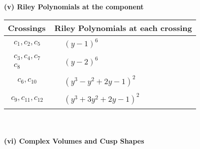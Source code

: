 \documentclass[1p]{elsarticle_modified}
\theoremstyle{definition}
\begin{document}
\newpage\renewcommand{\arraystretch}{1}
\flushleft \textbf{(v) Riley Polynomials at the component}\newline \\
\begin{tabular}{m{50pt}|m{274pt}}
Crossings & \hspace{64pt}Riley Polynomials at each crossing \\
\hline $$\begin{aligned}c_{1},c_{2},c_{5}\end{aligned}$$&$\begin{aligned}
&(y-1)^6
\end{aligned}$\\
\hline $$\begin{aligned}c_{3},c_{4},c_{7}\\c_{8}\end{aligned}$$&$\begin{aligned}
&(y-2)^6
\end{aligned}$\\
\hline $$\begin{aligned}c_{6},c_{10}\end{aligned}$$&$\begin{aligned}
&(y^3- y^2+2 y-1)^2
\end{aligned}$\\
\hline $$\begin{aligned}c_{9},c_{11},c_{12}\end{aligned}$$&$\begin{aligned}
&(y^3+3 y^2+2 y-1)^2
\end{aligned}$\\
\hline
\end{tabular}\\~\\
\newpage\flushleft \textbf{(vi) Complex Volumes and Cusp Shapes}
\end{document}
